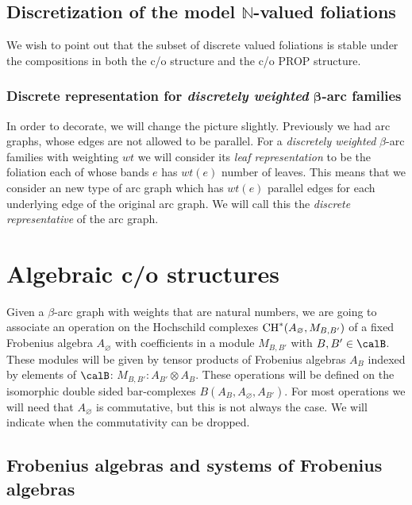 \subsection[Discretization of the model ${\mathbb N}$-valued foliations]{Discretization of the model $\boldsymbol{{\mathbb N}}$-valued foliations}

We wish to point out that the subset of discrete valued foliations is stable under the compositions
in both the c/o structure and the c/o PROP structure.


\subsubsection[Discrete representation for discretely weighted $\beta$-arc families]{Discrete representation for {\em discretely weighted} $\boldsymbol{\beta}$-arc families}

In order to decorate, we will change the picture slightly. Previously we had arc graphs, whose
edges are not allowed to be parallel. For a {\em discretely weighted} $\beta$-arc families with weighting $wt$
we  will consider its {\em leaf representation} to be the foliation each of whose bands $e$ has
$wt(e)$ number of leaves. This means that we consider an new type of arc graph which has $wt(e)$ parallel
edges for each underlying edge of the original arc graph. We will call this the {\em discrete representative}
of the arc graph.


\section{Algebraic c/o structures}
\label{algsection}

Given a $\beta$-arc graph with weights that are natural numbers, we are going to
associate an operation on the Hochschild complexes  ${\rm CH}^*(A_{\varnothing},M_{B,B'})$
of a f\/ixed Frobenius algebra $A_{\varnothing}$ with coef\/f\/icients in a module $M_{B,B'}$ with $B,B'\in \calB$.
These modules will be given by tensor products of Frobenius algebras $A_B$ indexed by elements of $\calB$: $M_{B,B'}: A_{B'}\otimes A_B$. These operations will be def\/ined on the isomorphic
double sided bar-complexes  $B(A_B,A_{\varnothing},A_{B'})$. For most operations we will need
that $A_{\varnothing}$ is commutative, but this is not always the case.  We will indicate
when the commutativity can be dropped.


\subsection{Frobenius algebras and systems of Frobenius algebras}

